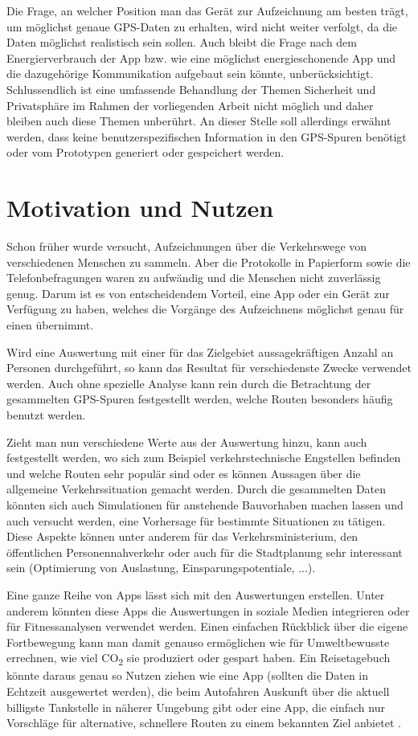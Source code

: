 Die Frage, an welcher Position man das Gerät zur Aufzeichnung am besten trägt, um möglichst genaue GPS-Daten zu erhalten, wird nicht weiter verfolgt, da die Daten möglichst realistisch sein sollen. Auch bleibt die Frage nach dem Energierverbrauch der App bzw. wie eine möglichst energieschonende App und die dazugehörige Kommunikation aufgebaut sein könnte, unberücksichtigt. Schlussendlich ist eine umfassende Behandlung der Themen Sicherheit und Privatsphäre im Rahmen der vorliegenden Arbeit nicht möglich und daher bleiben auch diese Themen unberührt. An dieser Stelle soll allerdings erwähnt werden, dass keine benutzerspezifischen Information in den GPS-Spuren benötigt oder vom Prototypen generiert oder gespeichert werden.

\section{Motivation und Nutzen}
Schon früher wurde versucht, Aufzeichnungen über die Verkehrswege von verschiedenen Menschen zu sammeln. Aber die Protokolle in Papierform sowie die Telefonbefragungen waren zu aufwändig und die Menschen nicht zuverlässig genug. Darum ist es von entscheidendem Vorteil, eine App oder ein Gerät zur Verfügung zu haben, welches die Vorgänge des Aufzeichnens möglichst genau für einen übernimmt. \cite{zheng_understanding_2010}

Wird eine Auswertung mit einer für das Zielgebiet aussagekräftigen Anzahl an Personen durchgeführt, so kann das Resultat  für verschiedenste Zwecke verwendet werden. Auch ohne spezielle Analyse kann rein durch die Betrachtung der gesammelten GPS-Spuren festgestellt werden, welche Routen besonders häufig benutzt werden.

Zieht man nun verschiedene Werte aus der Auswertung hinzu, kann auch festgestellt werden, wo sich zum Beispiel verkehrstechnische Engstellen befinden und welche Routen sehr populär sind oder es können Aussagen über die allgemeine Verkehrssituation gemacht werden. Durch die gesammelten Daten könnten sich auch Simulationen für anstehende Bauvorhaben machen lassen und auch versucht werden, eine Vorhersage für bestimmte Situationen zu tätigen. Diese Aspekte können unter anderem für das Verkehrsministerium,  den öffentlichen Personennahverkehr oder auch für die Stadtplanung sehr interessant sein (Optimierung von Auslastung, Einsparungspotentiale, ...).

Eine ganze Reihe von Apps lässt sich mit den Auswertungen erstellen. Unter anderem könnten diese Apps die Auswertungen in soziale Medien integrieren oder  für Fitnessanalysen verwendet werden. Einen einfachen Rückblick über die eigene Fortbewegung kann man damit genauso ermöglichen wie für Umweltbewusste errechnen, wie viel CO\textsubscript{2} sie produziert oder gespart haben. Ein Reisetagebuch könnte daraus genau so Nutzen ziehen wie eine App (sollten die Daten in Echtzeit ausgewertet werden), die beim Autofahren Auskunft über die aktuell billigste Tankstelle in näherer Umgebung gibt oder eine App, die einfach nur Vorschläge für alternative, schnellere Routen zu einem bekannten Ziel anbietet .

